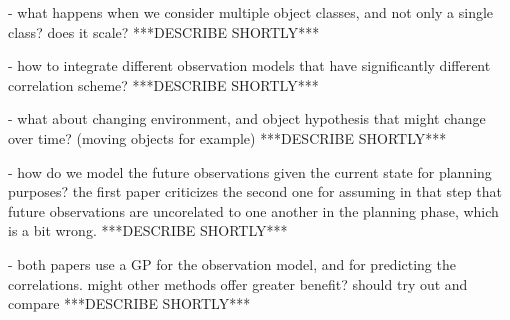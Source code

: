 \documentclass{article}
\begin{document}
	- what happens when we consider multiple object classes, and not only a single class? does it scale?
	***DESCRIBE SHORTLY***
	
	- how to integrate different observation models that have significantly different correlation scheme?
	***DESCRIBE SHORTLY***
	
	- what about changing environment, and object hypothesis that might change over time? (moving objects for example)
	***DESCRIBE SHORTLY***
	
	- how do we model the future observations given the current state for planning purposes? the first paper criticizes the second one for assuming in that step that future observations are uncorelated to one another in the planning phase, which is a bit wrong.  
	***DESCRIBE SHORTLY***
	
	- both papers use a GP for the observation model, and for predicting the correlations. might other methods offer greater benefit? should try out and compare
	***DESCRIBE SHORTLY***
	
	
	
  
\end{document}
